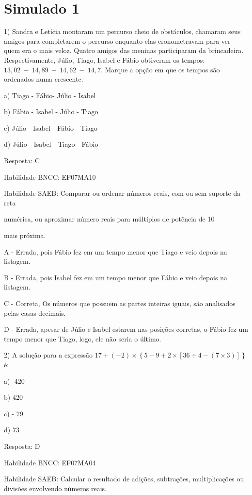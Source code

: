 {{{{{{{{{{{{{\hypertarget{simulado-1}{%
\section{Simulado 1}

1) Sandra e Letícia montaram um percurso cheio de obstáculos, chamaram
seus amigos para completarem o percurso enquanto elas cronometravam para
ver quem era o mais veloz. Quatro amigos das meninas participaram da
brincadeira. Respectivamente, Júlio, Tiago, Isabel e Fábio obtiveram os
tempos: \(13,02\  - \ 14,89\  - \ 14,62\  - \ 14,7\). Marque a opção em
que os tempos são ordenados numa crescente.~

a) Tiago - Fábio- Júlio - Isabel

b) Fábio - Isabel - Júlio - Tiago

c) Júlio - Isabel - Fábio - Tiago

d) Júlio - Isabel - Tiago - Fábio

Resposta: C

Habilidade BNCC: EF07MA10

Habilidade SAEB: Comparar ou ordenar números reais, com ou sem suporte
da reta

numérica, ou aproximar número reais para múltiplos de potência de 10

mais próxima.

A - Errada, pois Fábio fez em um tempo menor que Tiago e veio depois na
listagem.

B - Errada, pois Isabel fez em um tempo menor que Fábio e veio depois na
listagem.

C - Correta, Os números que possuem as partes inteiras iguais, são
analisados pelas casas decimais.

D - Errada, apesar de Júlio e Isabel estarem nas posições corretas, o
Fábio fez um tempo menor que Tiago, logo, ele não seria o último.

2) A solução para a expressão
\(17 + ( - 2) \times \left\{ 5 - 9 + 2 \times \left\lbrack 36 \div 4 - \left( 7 \times 3 \right) \right\rbrack \right\}\)
é:

a) -420

b) 420

c) - 79

d) 73

Resposta: D

Habilidade BNCC: EF07MA04

Habilidade SAEB: Calcular o resultado de adições, subtrações,
multiplicações ou divisões envolvendo números reais.

}}}}}}}}}}}}}}
